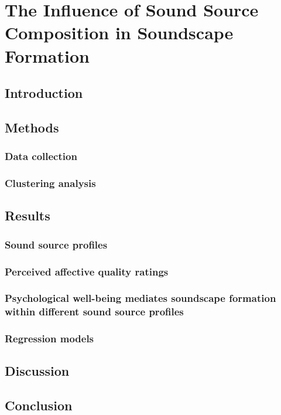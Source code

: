 \chapter{The Influence of Sound Source Composition in Soundscape Formation}
\label{ch:ssp}

\section{Introduction}

\section{Methods}
  \subsection{Data collection}
  \subsection{Clustering analysis}

\section{Results}
  \subsection{Sound source profiles}
  \subsection{Perceived affective quality ratings}
  \subsection{Psychological well-being mediates soundscape formation within different sound source profiles}
  \subsection{Regression models}

\section{Discussion}

\section{Conclusion}

